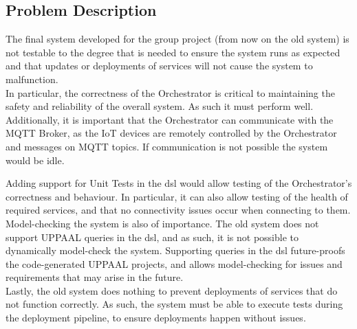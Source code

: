 \subsection{Problem Description}

The final system developed for the group project (from now on the old system) is not testable to the degree that is needed to ensure the system runs as expected and that updates or deployments of services will not cause the system to malfunction.\\

In particular, the correctness of the Orchestrator is critical to maintaining the safety and reliability of the overall system. As such it must perform well. Additionally, it is important that the Orchestrator can communicate with the MQTT Broker, as the IoT devices are remotely controlled by the Orchestrator and messages on MQTT topics. If communication is not possible the system would be idle. 

Adding support for Unit Tests in the \acrshort{dsl} would allow testing of the Orchestrator's correctness and behaviour. In particular, it can also allow testing of the health of required services, and that no connectivity issues occur when connecting to them.\\

Model-checking the system is also of importance. The old system does not support UPPAAL queries in the \acrshort{dsl}, and as such, it is not possible to dynamically model-check the system. Supporting queries in the \acrshort{dsl} future-proofs the code-generated UPPAAL projects, and allows model-checking for issues and requirements that may arise in the future.\\

Lastly, the old system does nothing to prevent deployments of services that do not function correctly. As such, the system must be able to execute tests during the deployment pipeline, to ensure deployments happen without issues.
